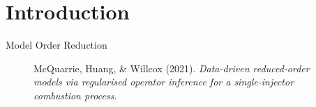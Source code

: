 \setcounter{framenumber}{0}

\section{Introduction}
\label{sec:intro}

\begin{frame}{Model Order Reduction}
  \begin{figure}
    \centering
    \caption*{\tiny McQuarrie, Huang, \& Willcox (2021). \textit{Data-driven reduced-order models via regularised operator inference for a single-injector combustion process}.}
  \end{figure}

\end{frame}
